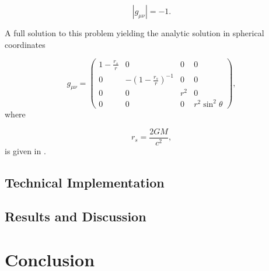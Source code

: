 \documentclass{CUP-JNL-DTM}%
\theoremstyle{definition}
\numberwithin{equation}{section}
\begin{document}
\begin{equation}
    |g_{\mu\nu}| = -1. 
\end{equation}

A full solution to this problem yielding the analytic solution in spherical coordinates

\begin{equation}
    g_{\mu\nu} = \begin{pmatrix}
        1 - \frac{r_s}{r} & 0 & 0 & 0 \\
        0 & -(1 - \frac{r_s}{r})^{-1} & 0 & 0 \\
        0 & 0 & r^2 & 0 \\
        0 & 0 & 0 & r^2\sin^2\theta
    \end{pmatrix},
\end{equation}
where 

\begin{equation}
    r_s = \frac{2GM}{c^2},
\end{equation}
is given in \cite{eigenchrisRelativity108aSchwarzschild}. 

\subsection{Technical Implementation}

\subsection{Results and Discussion}


\section{Conclusion}

\end{document}
